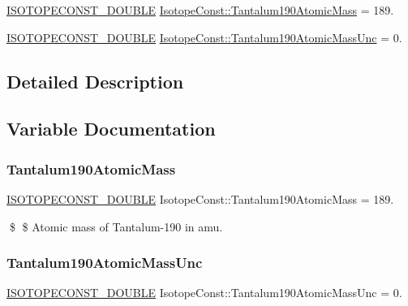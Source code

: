 \begin{DoxyCompactItemize}
\item 
\mbox{\hyperlink{group___isotope_const-_macros_ga8f45a7272ce02c0b4c65c44636ed719a}{I\+S\+O\+T\+O\+P\+E\+C\+O\+N\+S\+T\+\_\+\+D\+O\+U\+B\+LE}} \mbox{\hyperlink{group___isotope_const-_tantalum-_ta190_ga58ceab91c47a2d9542db5473600b024d}{Isotope\+Const\+::\+Tantalum190\+Atomic\+Mass}} = 189.
\item 
\mbox{\hyperlink{group___isotope_const-_macros_ga8f45a7272ce02c0b4c65c44636ed719a}{I\+S\+O\+T\+O\+P\+E\+C\+O\+N\+S\+T\+\_\+\+D\+O\+U\+B\+LE}} \mbox{\hyperlink{group___isotope_const-_tantalum-_ta190_ga7a95d4f1d48e67e558338f8fb77c8a11}{Isotope\+Const\+::\+Tantalum190\+Atomic\+Mass\+Unc}} = 0.
\end{DoxyCompactItemize}


\subsection{Detailed Description}


\subsection{Variable Documentation}
\mbox{\label{group___isotope_const-_tantalum-_ta190_ga58ceab91c47a2d9542db5473600b024d}} 
\subsubsection{\texorpdfstring{Tantalum190\+Atomic\+Mass}{Tantalum190AtomicMass}}
{\footnotesize\ttfamily \mbox{\hyperlink{group___isotope_const-_macros_ga8f45a7272ce02c0b4c65c44636ed719a}{I\+S\+O\+T\+O\+P\+E\+C\+O\+N\+S\+T\+\_\+\+D\+O\+U\+B\+LE}} Isotope\+Const\+::\+Tantalum190\+Atomic\+Mass = 189.}

\$ \$ Atomic mass of Tantalum-\/190 in amu. \mbox{\label{group___isotope_const-_tantalum-_ta190_ga7a95d4f1d48e67e558338f8fb77c8a11}} 
\subsubsection{\texorpdfstring{Tantalum190\+Atomic\+Mass\+Unc}{Tantalum190AtomicMassUnc}}
{\footnotesize\ttfamily \mbox{\hyperlink{group___isotope_const-_macros_ga8f45a7272ce02c0b4c65c44636ed719a}{I\+S\+O\+T\+O\+P\+E\+C\+O\+N\+S\+T\+\_\+\+D\+O\+U\+B\+LE}} Isotope\+Const\+::\+Tantalum190\+Atomic\+Mass\+Unc = 0.}

